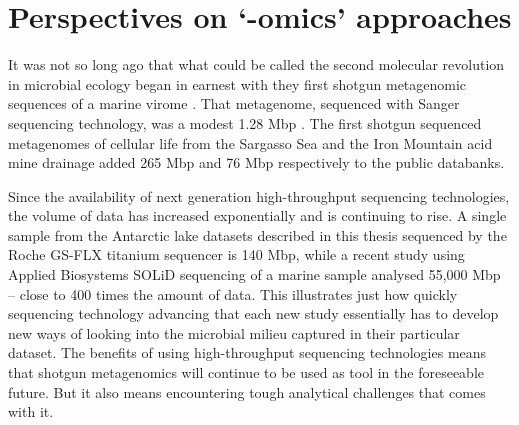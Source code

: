 
\section{Perspectives on `-omics' approaches }
It was not so long ago that what could be called the second molecular revolution in microbial ecology began in earnest with they first shotgun metagenomic sequences of a marine virome \cite{Breitbart2002}.
That metagenome, sequenced with Sanger sequencing technology, was a modest 1.28 Mbp \cite{Breitbart2002}.
The first shotgun sequenced metagenomes of cellular life from the Sargasso Sea \cite{Venter2004} and the Iron Mountain acid mine drainage \cite{Tyson2004} added 265 Mbp and 76 Mbp respectively to the public databanks.

Since the availability of next generation high-throughput sequencing technologies, the volume of data has increased exponentially and is continuing to rise.
A single sample from the Antarctic lake datasets described in this thesis sequenced by the Roche GS-FLX titanium sequencer is 140 Mbp, while a recent study using Applied Biosystems SOLiD sequencing of a marine sample \cite{Iverson2012} analysed 55,000 Mbp -- close to 400 times the amount of data.
This illustrates just how quickly sequencing technology advancing that each new study essentially has to develop new ways of looking into the microbial milieu captured in their particular dataset.
The benefits of using high-throughput sequencing technologies means that shotgun metagenomics will continue to be used as tool in the foreseeable future.
But it also means encountering tough analytical challenges that comes with it.

